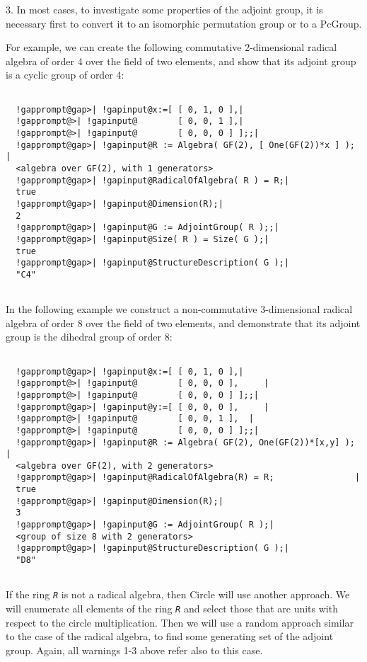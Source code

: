 \documentclass[a4paper,11pt]{report}
\begin{document}
{{{ 3. In most cases, to investigate some properties of the adjoint group, it is
necessary first to convert it to an isomorphic permutation group or to a
PcGroup. 

 For example, we can create the following commutative 2-dimensional radical
algebra of order 4 over the field of two elements, and show that its adjoint
group is a cyclic group of order 4: 
\begin{Verbatim}[commandchars=!@|,fontsize=\small,frame=single,label=Example]
  
  !gapprompt@gap>| !gapinput@x:=[ [ 0, 1, 0 ],|
  !gapprompt@>| !gapinput@        [ 0, 0, 1 ],|
  !gapprompt@>| !gapinput@        [ 0, 0, 0 ] ];;|
  !gapprompt@gap>| !gapinput@R := Algebra( GF(2), [ One(GF(2))*x ] );  |
  <algebra over GF(2), with 1 generators>
  !gapprompt@gap>| !gapinput@RadicalOfAlgebra( R ) = R;|
  true
  !gapprompt@gap>| !gapinput@Dimension(R);|
  2
  !gapprompt@gap>| !gapinput@G := AdjointGroup( R );;|
  !gapprompt@gap>| !gapinput@Size( R ) = Size( G );|
  true
  !gapprompt@gap>| !gapinput@StructureDescription( G );|
  "C4"
  
\end{Verbatim}
 In the following example we construct a non-commutative 3-dimensional radical
algebra of order 8 over the field of two elements, and demonstrate that its
adjoint group is the dihedral group of order 8: \pagebreak 
\begin{Verbatim}[commandchars=!@|,fontsize=\small,frame=single,label=Example]
  
  !gapprompt@gap>| !gapinput@x:=[ [ 0, 1, 0 ],|
  !gapprompt@>| !gapinput@        [ 0, 0, 0 ],     |
  !gapprompt@>| !gapinput@        [ 0, 0, 0 ] ];;|
  !gapprompt@gap>| !gapinput@y:=[ [ 0, 0, 0 ],     |
  !gapprompt@>| !gapinput@        [ 0, 0, 1 ],  |
  !gapprompt@>| !gapinput@        [ 0, 0, 0 ] ];;|
  !gapprompt@gap>| !gapinput@R := Algebra( GF(2), One(GF(2))*[x,y] );  |
  <algebra over GF(2), with 2 generators>
  !gapprompt@gap>| !gapinput@RadicalOfAlgebra(R) = R;                |
  true
  !gapprompt@gap>| !gapinput@Dimension(R);|
  3
  !gapprompt@gap>| !gapinput@G := AdjointGroup( R );|
  <group of size 8 with 2 generators>
  !gapprompt@gap>| !gapinput@StructureDescription( G );|
  "D8"
  
\end{Verbatim}
 If the ring \mbox{\texttt{\mdseries\slshape R}} is not a radical algebra, then \textsf{Circle} will use another approach. We will enumerate all elements of the ring \mbox{\texttt{\mdseries\slshape R}} and select those that are units with respect to the circle multiplication.
Then we will use a random approach similar to the case of the radical algebra,
to find some generating set of the adjoint group. Again, all warnings 1-3
above refer also to this case. 

}}}
\end{document}
